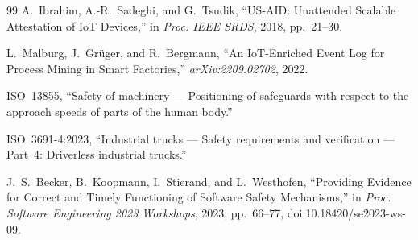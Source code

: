 \documentclass[manuscript,screen,review]{acmart}
\begin{document}
\begin{thebibliography}{99}
A.~Ibrahim, A.-R.~Sadeghi, and G.~Tsudik,
``US-AID: Unattended Scalable Attestation of IoT Devices,''
in \textit{Proc. IEEE SRDS}, 2018, pp.~21--30.

L.~Malburg, J.~Gr\"uger, and R.~Bergmann,
``An IoT-Enriched Event Log for Process Mining in Smart Factories,''
\textit{arXiv:2209.02702}, 2022.

ISO~13855,
``Safety of machinery --- Positioning of safeguards with respect to the approach speeds of parts of the human body.''

ISO~3691-4:2023,
``Industrial trucks --- Safety requirements and verification --- Part~4: Driverless industrial trucks.''

J.~S.~Becker, B.~Koopmann, I.~Stierand, and L.~Westhofen,
``Providing Evidence for Correct and Timely Functioning of Software Safety Mechanisms,''
in \textit{Proc. Software Engineering 2023 Workshops}, 2023, pp.~66--77, doi:10.18420/se2023-ws-09.

\end{thebibliography}
\end{document}
